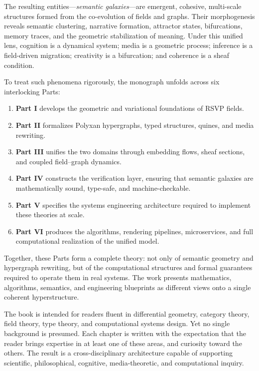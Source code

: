 The resulting entities---\emph{semantic galaxies}---are emergent,
cohesive, multi-scale structures formed from the co-evolution of fields
and graphs. Their morphogenesis reveals semantic clustering, narrative
formation, attractor states, bifurcations, memory traces, and the
geometric stabilization of meaning. Under this unified lens, cognition
is a dynamical system; media is a geometric process; inference is a
field-driven migration; creativity is a bifurcation; and coherence is a
sheaf condition.

To treat such phenomena rigorously, the monograph unfolds across six
interlocking Parts:

\begin{enumerate}
\item \textbf{Part I} develops the geometric and variational foundations
      of RSVP fields.
\item \textbf{Part II} formalizes Polyxan hypergraphs, typed structures,
      quines, and media rewriting.
\item \textbf{Part III} unifies the two domains through embedding flows,
      sheaf sections, and coupled field--graph dynamics.
\item \textbf{Part IV} constructs the verification layer, ensuring that
      semantic galaxies are mathematically sound, type-safe, and
      machine-checkable.
\item \textbf{Part V} specifies the systems engineering architecture
      required to implement these theories at scale.
\item \textbf{Part VI} produces the algorithms, rendering pipelines,
      microservices, and full computational realization of the unified
      model.
\end{enumerate}

Together, these Parts form a complete theory: not only of semantic
geometry and hypergraph rewriting, but of the computational structures
and formal guarantees required to operate them in real systems. The work
presents mathematics, algorithms, semantics, and engineering blueprints
as different views onto a single coherent hyperstructure.

The book is intended for readers fluent in differential geometry,
category theory, field theory, type theory, and computational systems
design. Yet no single background is presumed. Each chapter is written
with the expectation that the reader brings expertise in at least one of
these areas, and curiosity toward the others. The result is a
cross-disciplinary architecture capable of supporting scientific,
philosophical, cognitive, media-theoretic, and computational inquiry.

